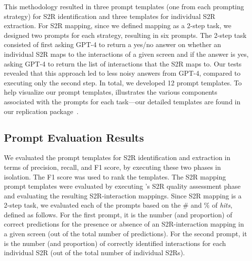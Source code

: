 This methodology resulted in three prompt templates (one from each prompting strategy) for S2R identification and three templates for individual S2R extraction. 
For S2R mapping, since we defined mapping as a 2-step task, we designed two prompts for each strategy, resulting in six prompts. 
The 2-step task consisted of first asking GPT-4 to return a yes/no answer on whether an individual S2R maps to the interactions of a given screen and if the answer is yes, asking GPT-4 to return the list of interactions that the S2R maps to. 
Our tests revealed that this approach led to less noisy answers from GPT-4, compared to executing only the second step. 
In total, we developed 12 prompt templates. To help visualize our prompt templates,  illustrates the various components associated with the prompts for each task---our detailed templates are found in our replication package~\cite{package,doi}.

\subsection{Prompt Evaluation Results}
\label{sec:development_results}

We evaluated the prompt templates for S2R identification and extraction in terms of precision, recall, and F1 score, by executing these two phases in isolation. 
The F1 score was used to rank the templates. 
The S2R mapping prompt templates were evaluated by executing \tool's S2R quality assessment phase and evaluating the resulting S2R-interaction mappings. 
Since S2R mapping is a 2-step task, we evaluated each of the prompts based on the \# and \% of \textit{hits}, defined as follows.
For the first prompt, it is the number (and proportion) of correct predictions for the presence or absence of an S2R-interaction mapping in a given screen (out of the total number of predictions). 
For the second prompt, it is the number (and proportion) of correctly identified interactions for each individual S2R (out of the total number of individual S2Rs).


\begin{table}[t!]
	\centering
	\caption{Prompt Template Performance for S2R Identification}
	\label{tab:identification_results_dev_set}
\end{table}

